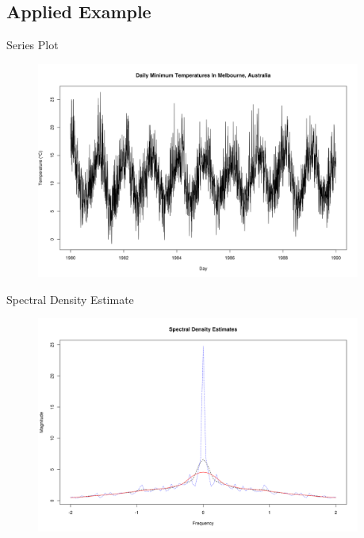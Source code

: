 \subsection{Applied Example}
\begin{frame}{Series Plot}
    \begin{figure}
    \centering
    \includegraphics[width = 0.95\textwidth]{res/exA.png}
    \end{figure}
\end{frame}

\begin{frame}{Spectral Density Estimate}
    \begin{figure}
    \centering
    \includegraphics[width = 0.95\textwidth]{res/exA_spec.png}
    \end{figure}
\end{frame}

